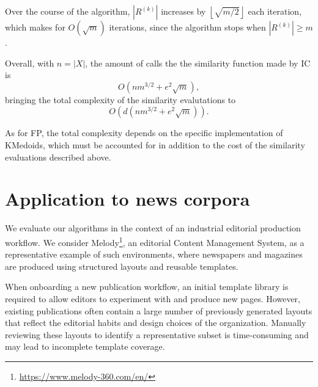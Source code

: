 \documentclass{ieeeaccess}
\newcommand{\representativeamount}{m}
\newcommand{\maxpartitionsize}{\rho}
\newcommand{\samplesize}{e}
\newcommand{\reductionfactor}{\lambda}
\newcommand{\kmedoidsalg}{KMedoids\xspace}
\newcommand{\partitioning}{FP\xspace}
\newcommand{\inclusion}{IC\xspace}
\begin{document}
Over the course of the algorithm, $|R^{(k)}|$ increases by $\left\lfloor \sqrt{\representativeamount/2}\right\rfloor$ each iteration, which makes for $O(\sqrt{\representativeamount})$
iterations, since the algorithm stops when $|R^{(k)}| \ge \representativeamount$.

Overall, with $n=|X|$, the amount of calls the the similarity function made by \inclusion is 
\[O(nm^{3/2}+\samplesize^2\sqrt{\representativeamount}),\]
bringing the total complexity of the similarity evalutations to
\[O(d(nm^{3/2}+\samplesize^2\sqrt{\representativeamount})).\]

As for \partitioning, the total complexity depends on the specific implementation of KMedoids, which must be accounted for in addition to the cost of the similarity evaluations described above.


\section{Application to news corpora}
\label{sec:results}

We evaluate our algorithms in the context of an industrial editorial production workflow. We consider Melody\footnote{\url{https://www.melody-360.com/en/}}, an editorial Content Management System, as a representative example of such environments, where newspapers and magazines are produced using structured layouts and reusable templates.

When onboarding a new publication workflow, an initial template library is required to allow editors to experiment with and produce new pages. However, existing publications often contain a large number of previously generated layouts that reflect the editorial habits and design choices of the organization. Manually reviewing these layouts to identify a representative subset is time-consuming and may lead to incomplete template coverage.
\end{document}
